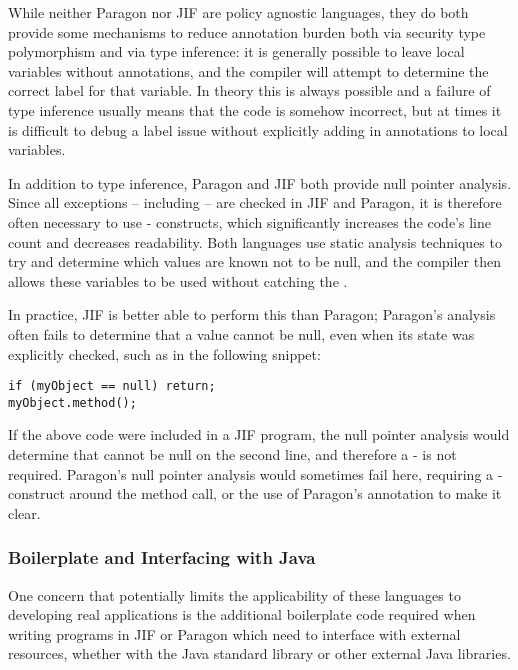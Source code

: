 While neither Paragon nor JIF are policy agnostic languages, they do both provide some mechanisms to reduce annotation burden both via security type polymorphism and via type inference: it is generally possible to leave local variables without annotations, and the compiler will attempt to determine the correct label for that variable. In theory this is always possible and a failure of type inference usually means that the code is somehow incorrect, but at times it is difficult to debug a label issue without explicitly adding in annotations to local variables.

In addition to type inference, Paragon and JIF both provide null pointer analysis. Since all exceptions -- including  -- are checked in JIF and Paragon, it is therefore often necessary to use - constructs, which significantly increases the code's line count and decreases readability. Both languages use static analysis techniques to try and determine which values are known not to be null, and the compiler then allows these variables to be used without catching the .

In practice, JIF is better able to perform this than Paragon; Paragon's analysis often fails to determine that a value cannot be null, even when its state was explicitly checked, such as in the following snippet:

\begin{verbatim}
if (myObject == null) return;
myObject.method();
\end{verbatim}

If the above code were included in a JIF program, the null pointer analysis would determine that  cannot be null on the second line, and therefore a - is not required. Paragon's null pointer analysis would sometimes fail here, requiring a - construct around the method call, or the use of Paragon's  annotation to make it clear.

\subsubsection{Boilerplate and Interfacing with Java}

One concern that potentially limits the applicability of these languages to developing real applications is the additional boilerplate code required when writing programs in JIF or Paragon which need to interface with external resources, whether with the Java standard library or other external Java libraries.

